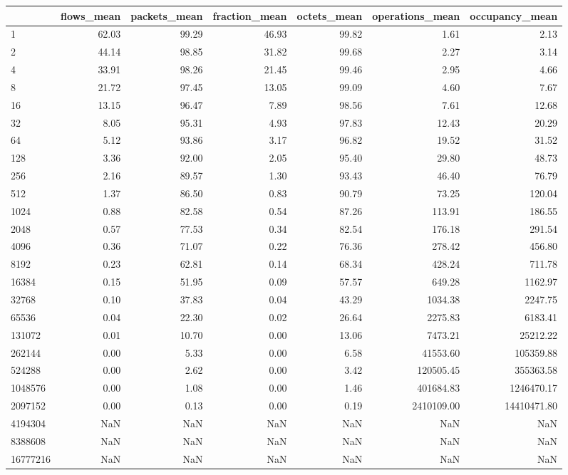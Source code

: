 \begin{tabular}{lrrrrrr}
\toprule
 & flows_mean & packets_mean & fraction_mean & octets_mean & operations_mean & occupancy_mean \\
\midrule
1 & 62.03 & 99.29 & 46.93 & 99.82 & 1.61 & 2.13 \\
2 & 44.14 & 98.85 & 31.82 & 99.68 & 2.27 & 3.14 \\
4 & 33.91 & 98.26 & 21.45 & 99.46 & 2.95 & 4.66 \\
8 & 21.72 & 97.45 & 13.05 & 99.09 & 4.60 & 7.67 \\
16 & 13.15 & 96.47 & 7.89 & 98.56 & 7.61 & 12.68 \\
32 & 8.05 & 95.31 & 4.93 & 97.83 & 12.43 & 20.29 \\
64 & 5.12 & 93.86 & 3.17 & 96.82 & 19.52 & 31.52 \\
128 & 3.36 & 92.00 & 2.05 & 95.40 & 29.80 & 48.73 \\
256 & 2.16 & 89.57 & 1.30 & 93.43 & 46.40 & 76.79 \\
512 & 1.37 & 86.50 & 0.83 & 90.79 & 73.25 & 120.04 \\
1024 & 0.88 & 82.58 & 0.54 & 87.26 & 113.91 & 186.55 \\
2048 & 0.57 & 77.53 & 0.34 & 82.54 & 176.18 & 291.54 \\
4096 & 0.36 & 71.07 & 0.22 & 76.36 & 278.42 & 456.80 \\
8192 & 0.23 & 62.81 & 0.14 & 68.34 & 428.24 & 711.78 \\
16384 & 0.15 & 51.95 & 0.09 & 57.57 & 649.28 & 1162.97 \\
32768 & 0.10 & 37.83 & 0.04 & 43.29 & 1034.38 & 2247.75 \\
65536 & 0.04 & 22.30 & 0.02 & 26.64 & 2275.83 & 6183.41 \\
131072 & 0.01 & 10.70 & 0.00 & 13.06 & 7473.21 & 25212.22 \\
262144 & 0.00 & 5.33 & 0.00 & 6.58 & 41553.60 & 105359.88 \\
524288 & 0.00 & 2.62 & 0.00 & 3.42 & 120505.45 & 355363.58 \\
1048576 & 0.00 & 1.08 & 0.00 & 1.46 & 401684.83 & 1246470.17 \\
2097152 & 0.00 & 0.13 & 0.00 & 0.19 & 2410109.00 & 14410471.80 \\
4194304 & NaN & NaN & NaN & NaN & NaN & NaN \\
8388608 & NaN & NaN & NaN & NaN & NaN & NaN \\
16777216 & NaN & NaN & NaN & NaN & NaN & NaN \\
\bottomrule
\end{tabular}
